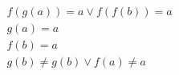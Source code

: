 \begin{align*}
%
& f(g(a)) = a \lor f(f(b)) = a
~\\~
& g(a) = a
~\\~
& f(b) = a
~\\~
& g(b)  \neq  g(b) \lor f(a)  \neq  a
%
\end{align*}
